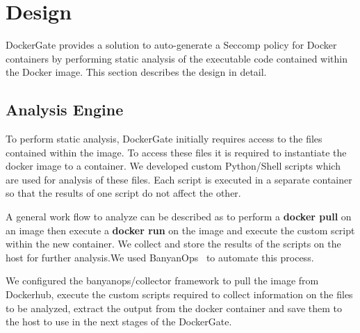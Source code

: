\section{Design}
\label{sec:design}
DockerGate provides a solution to auto-generate a Seccomp policy for Docker containers by performing static analysis of the executable code contained within the Docker image. This section describes the design in detail.

\subsection{Analysis Engine}

To perform static analysis, DockerGate initially requires access to the files contained within the image. To access these files it is required to instantiate the docker image to a container. We developed custom Python/Shell scripts which are  used for analysis of these files. Each script is executed in a separate container so that the results of one script do not affect the other. 

A general work flow to analyze can be described as to perform a \textbf{docker pull} on an image then execute a \textbf{docker run} on the image and execute the custom script within the new container. We collect and store the results of the scripts on the host for further analysis.We used BanyanOps~\cite{banyanops} to automate this process.

We configured the banyanops/collector framework to pull the image from Dockerhub, execute the custom scripts required to collect information on the files to be analyzed, extract the output from the docker container and save them to the host to use in the next stages of the DockerGate.

